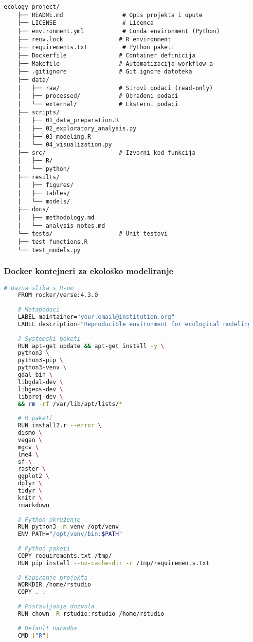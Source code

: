 \documentclass[11pt,oneside]{book}
\begin{document}
\begin{lstlisting}[caption=Preporučena struktura direktorija]
	ecology_project/
	├── README.md                 # Opis projekta i upute
	├── LICENSE                   # Licenca
	├── environment.yml           # Conda environment (Python)
	├── renv.lock                # R environment
	├── requirements.txt          # Python paketi
	├── Dockerfile               # Container definicija
	├── Makefile                 # Automatizacija workflow-a
	├── .gitignore               # Git ignore datoteka
	├── data/
	│   ├── raw/                 # Sirovi podaci (read-only)
	│   ├── processed/           # Obrađeni podaci
	│   └── external/            # Eksterni podaci
	├── scripts/
	│   ├── 01_data_preparation.R
	│   ├── 02_exploratory_analysis.py
	│   ├── 03_modeling.R
	│   └── 04_visualization.py
	├── src/                     # Izvorni kod funkcija
	│   ├── R/
	│   └── python/
	├── results/
	│   ├── figures/
	│   ├── tables/
	│   └── models/
	├── docs/
	│   ├── methodology.md
	│   └── analysis_notes.md
	└── tests/                   # Unit testovi
	├── test_functions.R
	└── test_models.py
\end{lstlisting}

\subsubsection{Docker kontejneri za ekološko modeliranje}

\begin{lstlisting}[language=bash, caption=Dockerfile za R + Python okruženje]
	# Bazna slika s R-om
	FROM rocker/verse:4.3.0
	
	# Metapodaci
	LABEL maintainer="your.email@institution.org"
	LABEL description="Reproducible environment for ecological modeling"
	
	# Systemski paketi
	RUN apt-get update && apt-get install -y \
	python3 \
	python3-pip \
	python3-venv \
	gdal-bin \
	libgdal-dev \
	libgeos-dev \
	libproj-dev \
	&& rm -rf /var/lib/apt/lists/*
	
	# R paketi
	RUN install2.r --error \
	dismo \
	vegan \
	mgcv \
	lme4 \
	sf \
	raster \
	ggplot2 \
	dplyr \
	tidyr \
	knitr \
	rmarkdown
	
	# Python okruženje
	RUN python3 -m venv /opt/venv
	ENV PATH="/opt/venv/bin:$PATH"
	
	# Python paketi
	COPY requirements.txt /tmp/
	RUN pip install --no-cache-dir -r /tmp/requirements.txt
	
	# Kopiranje projekta
	WORKDIR /home/rstudio
	COPY . .
	
	# Postavljanje dozvola
	RUN chown -R rstudio:rstudio /home/rstudio
	
	# Default naredba
	CMD ["R"]
\end{lstlisting}
\end{document}
